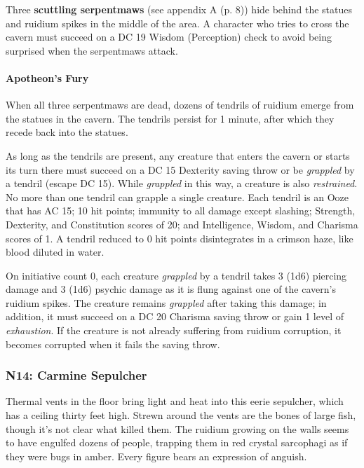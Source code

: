 \documentclass[a4paper, 11pt, bg=full, twocolumn, nooutline]{dndbook}
\begin{document}
Three \textbf{scuttling serpentmaws} (see appendix A (p. 8)) hide behind the statues and ruidium spikes in the middle of the area. A character who tries to cross the cavern must succeed on a DC 19 Wisdom (Perception) check to avoid being surprised when the serpentmaws attack.

\paragraph{Apotheon's Fury}

When all three serpentmaws are dead, dozens of tendrils of ruidium emerge from the statues in the cavern. The tendrils persist for 1 minute, after which they recede back into the statues.

As long as the tendrils are present, any creature that enters the cavern or starts its turn there must succeed on a DC 15 Dexterity saving throw or be \textit{grappled} by a tendril (escape DC 15). While \textit{grappled} in this way, a creature is also \textit{restrained}. No more than one tendril can grapple a single creature. Each tendril is an Ooze that has AC 15; 10 hit points; immunity to all damage except slashing; Strength, Dexterity, and Constitution scores of 20; and Intelligence, Wisdom, and Charisma scores of 1. A tendril reduced to 0 hit points disintegrates in a crimson haze, like blood diluted in water.

On initiative count 0, each creature \textit{grappled} by a tendril takes 3 (1d6) piercing damage and 3 (1d6) psychic damage as it is flung against one of the cavern's ruidium spikes. The creature remains \textit{grappled} after taking this damage; in addition, it must succeed on a DC 20 Charisma saving throw or gain 1 level of \textit{exhaustion}. If the creature is not already suffering from ruidium corruption, it becomes corrupted when it fails the saving throw.

\subsubsection{N14: Carmine Sepulcher}

\begin{DndReadAloud}
Thermal vents in the floor bring light and heat into this eerie sepulcher, which has a ceiling thirty feet high. Strewn around the vents are the bones of large fish, though it's not clear what killed them.
The ruidium growing on the walls seems to have engulfed dozens of people, trapping them in red crystal sarcophagi as if they were bugs in amber. Every figure bears an expression of anguish.
\end{DndReadAloud}
\end{document}
